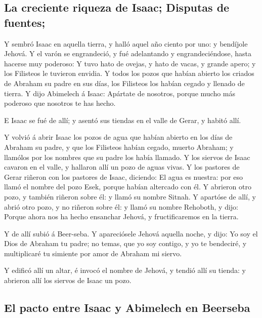 \hypertarget{la-creciente-riqueza-de-isaac-disputas-de-fuentes}{%
\subsection{La creciente riqueza de Isaac; Disputas de
fuentes;}\label{la-creciente-riqueza-de-isaac-disputas-de-fuentes}}

 Y sembró Isaac en aquella tierra, y halló aquel año
ciento por uno: y bendíjole Jehová.  Y el varón se
engrandeció, y fué adelantando y engrandeciéndose, hasta hacerse muy
poderoso:  Y tuvo hato de ovejas, y hato de vacas, y
grande apero; y los Filisteos le tuvieron envidia.  Y
todos los pozos que habían abierto los criados de Abraham su padre en
sus días, los Filisteos los habían cegado y llenado de tierra.
 Y dijo Abimelech á Isaac: Apártate de nosotros, porque
mucho más poderoso que nosotros te has hecho.

 E Isaac se fué de allí; y asentó sus tiendas en el valle
de Gerar, y habitó allí.

 Y volvió á abrir Isaac los pozos de agua que habían
abierto en los días de Abraham su padre, y que los Filisteos habían
cegado, muerto Abraham; y llamólos por los nombres que su padre los
había llamado.  Y los siervos de Isaac cavaron en el
valle, y hallaron allí un pozo de aguas vivas.  Y los
pastores de Gerar riñeron con los pastores de Isaac, diciendo: El agua
es nuestra: por eso llamó el nombre del pozo Esek, porque habían
altercado con él.  Y abrieron otro pozo, y también
riñeron sobre él: y llamó su nombre Sitnah.  Y apartóse
de allí, y abrió otro pozo, y no riñeron sobre él: y llamó su nombre
Rehoboth, y dijo: Porque ahora nos ha hecho ensanchar Jehová, y
fructificaremos en la tierra.

 Y de allí subió á Beer-seba.  Y
apareciósele Jehová aquella noche, y dijo: Yo soy el Dios de Abraham tu
padre; no temas, que yo soy contigo, y yo te bendeciré, y multiplicaré
tu simiente por amor de Abraham mi siervo.

 Y edificó allí un altar, é invocó el nombre de Jehová, y
tendió allí su tienda: y abrieron allí los siervos de Isaac un pozo.

\hypertarget{el-pacto-entre-isaac-y-abimelech-en-beerseba}{%
\subsection{El pacto entre Isaac y Abimelech en
Beerseba}\label{el-pacto-entre-isaac-y-abimelech-en-beerseba}}

